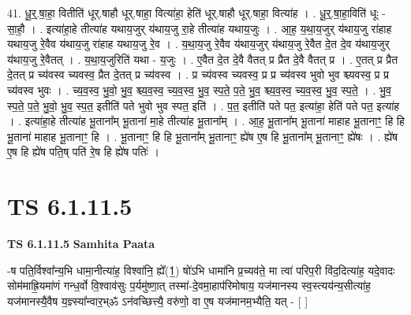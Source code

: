 \documentclass[17pt]{extarticle}
\begin{document}
41. धू॒र्॒.षा॒हा॒ वितीति॑ धूर्.षाहौ धूर्.षाहा॒ वित्या॑हा॒ हेति॑ धूर्.षाहौ धूर्.षाहा॒ वित्या॑ह । . धू॒र्॒.षा॒हा॒विति॑ धूः - सा॒हौ॒ । . इत्या॑हा॒हे तीत्या॑ह यथाय॒जुर् य॑थाय॒जु रा॒हे तीत्या॑ह यथाय॒जुः । . आ॒ह॒ य॒था॒य॒जुर् य॑थाय॒जु रा॑हाह यथाय॒जु रे॒वैव य॑थाय॒जु रा॑हाह यथाय॒जु रे॒व । . य॒था॒य॒जु रे॒वैव य॑थाय॒जुर् य॑थाय॒जु रे॒वैत दे॒त दे॒व य॑थाय॒जुर् य॑थाय॒जु रे॒वैतत् । . य॒था॒य॒जुरिति॑ यथा - य॒जुः । . ए॒वैत दे॒त दे॒वै वैतत् प्र प्रैत दे॒वै वैतत् प्र । . ए॒तत् प्र प्रैत दे॒तत् प्र च्य॑वस्व च्यवस्व॒ प्रैत दे॒तत् प्र च्य॑वस्व । . प्र च्य॑वस्व च्यवस्व॒ प्र प्र च्य॑वस्व भुवो भुव श्च्यवस्व॒ प्र प्र च्य॑वस्व भुवः । . च्य॒व॒स्व॒ भु॒वो॒ भु॒व॒ श्च्य॒व॒स्व॒ च्य॒व॒स्व॒ भु॒व॒ स्प॒ते॒ प॒ते॒ भु॒व॒ श्च्य॒व॒स्व॒ च्य॒व॒स्व॒ भु॒व॒ स्प॒ते॒ । . भु॒व॒ स्प॒ते॒ प॒ते॒ भु॒वो॒ भु॒व॒ स्प॒त॒ इतीति॑ पते भुवो भुव स्पत॒ इति॑ । . प॒त॒ इतीति॑ पते पत॒ इत्या॑हा॒ हेति॑ पते पत॒ इत्या॑ह । . इत्या॑हा॒हे तीत्या॑ह भू॒ताना᳚म् भू॒ताना॑ मा॒हे तीत्या॑ह भू॒ताना᳚म् । . आ॒ह॒ भू॒ताना᳚म् भू॒ताना॑ माहाह भू॒तानाꣳ॒॒ हि हि भू॒ताना॑ माहाह भू॒तानाꣳ॒॒ हि । . भू॒तानाꣳ॒॒ हि हि भू॒ताना᳚म् भू॒तानाꣳ॒॒ ह्ये॑ष ए॒ष हि भू॒ताना᳚म् भू॒तानाꣳ॒॒ ह्ये॑षः । . ह्ये॑ष ए॒ष हि ह्ये॑ष पति॒ष् पति॑ रे॒ष हि ह्ये॑ष पतिः॑ । \newline
\pagebreak
{}

\section{ TS 6.1.11.5 }

\textbf{TS 6.1.11.5 } \newline
\textbf{Samhita Paata} \newline

-ष पति॒र्विश्वा᳚न्य॒भि धामा॒नीत्या॑ह॒ विश्वा॑नि॒ ह्ये᳚(1॒) षो॑ऽभि धामा॑नि प्र॒च्यव॑ते॒ मा त्वा॑ परिप॒री वि॑द॒दित्या॑ह॒ यदे॒वादः सोम॑माह्रि॒यमा॑णं गन्ध॒र्वो वि॒श्वाव॑सुः प॒र्यमु॑ष्णा॒त् तस्मा॑-दे॒वमा॒हाप॑रिमोषाय॒ यज॑मानस्य स्व॒स्त्यय॑न्य॒सीत्या॑ह॒ यज॑मानस्यै॒वैष य॒ज्ञ्स्या᳚न्वार॒भ्ॐ ऽन॑वच्छित्त्यै॒ वरु॑णो॒ वा ए॒ष यज॑मानम॒भ्यैति॒ यत् - [  ] \newline
\end{document}
